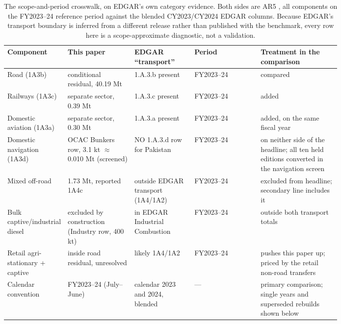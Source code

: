 \begin{table}[htbp]
\centering
\scriptsize
\setlength{\tabcolsep}{4pt}
\begin{tabular}{@{}p{0.17\linewidth}p{0.20\linewidth}p{0.18\linewidth}lp{0.24\linewidth}@{}}
\toprule
\textbf{Component} & \textbf{This paper} & \textbf{EDGAR ``transport''} &
\textbf{Period} & \textbf{Treatment in the comparison} \\
\midrule
Road (1A3b) & conditional residual, 40.19 Mt & 1.A.3.b present & FY2023--24 & compared \\
Railways (1A3c) & separate sector, 0.39 Mt & 1.A.3.c present & FY2023--24 & added \\
Domestic aviation (1A3a) & separate sector, 0.30 Mt & 1.A.3.a present & FY2023--24 &
  added, on the same fiscal year \\
Domestic navigation (1A3d) & OCAC Bunkers row, 3.1 kt $\approx$ 0.010 Mt (screened) &
  NO 1.A.3.d row for Pakistan & FY2023--24 & on neither side of the headline;
  all ten held editions converted in the navigation screen \\
Mixed off-road & 1.73 Mt, reported 1A4c & outside EDGAR transport (1A4/1A2) &
  FY2023--24 & excluded from headline; secondary line includes it \\
Bulk captive/industrial diesel & excluded by construction (Industry row, 400 kt) &
  in EDGAR Industrial Combustion & FY2023--24 & outside both transport totals \\
Retail agri-stationary + captive & inside road residual, unresolved & likely 1A4/1A2 &
  FY2023--24 & pushes this paper up; priced by the retail non-road transfers \\
Calendar convention & FY2023--24 (July--June) & calendar 2023 and 2024, blended &
  --- & primary comparison; single years and superseded rebuilds shown below \\
\bottomrule
\end{tabular}
\caption{The scope-and-period crosswalk, on EDGAR's own category evidence. Both sides
are AR5 \COe{}, all components on the FY2023--24 reference period against the blended
CY2023/CY2024 EDGAR columns. Because EDGAR's transport boundary is inferred from a
different release rather than published with the benchmark, every row here is a
scope-approximate diagnostic, not a validation.}
\label{tab:crosswalk}
\end{table}

